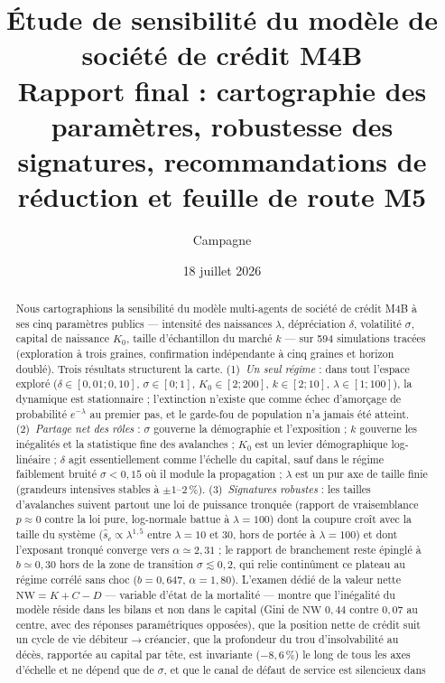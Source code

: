 \documentclass[11pt,a4paper]{article}
\title{Étude de sensibilité du modèle de société de crédit M4B\\
\large Rapport final : cartographie des paramètres, robustesse des
signatures, recommandations de réduction et feuille de route M5}
\author{Campagne \code{recherche/sensibilite\_m4b}}
\date{18 juillet 2026}
\newcommand{\NW}{\mathrm{NW}}
\begin{document}
\maketitle

\begin{abstract}
Nous cartographions la sensibilité du modèle multi-agents de société de
crédit M4B à ses cinq paramètres publics — intensité des naissances
$\lambda$, dépréciation $\delta$, volatilité $\sigma$, capital de
naissance $K_0$, taille d'échantillon du marché $k$ — sur 594
simulations tracées (exploration à trois graines, confirmation
indépendante à cinq graines et horizon doublé). Trois résultats
structurent la carte. (1)~\emph{Un seul régime} : dans tout l'espace
exploré ($\delta\in[0{,}01;0{,}10]$, $\sigma\in[0;1]$,
$K_0\in[2;200]$, $k\in[2;10]$, $\lambda\in[1;100]$), la dynamique est
stationnaire ; l'extinction n'existe que comme échec d'amorçage de
probabilité $e^{-\lambda}$ au premier pas, et le garde-fou de
population n'a jamais été atteint. (2)~\emph{Partage net des rôles} :
$\sigma$ gouverne la démographie et l'exposition ; $k$ gouverne les
inégalités et la statistique fine des avalanches ; $K_0$ est un levier
démographique log-linéaire ; $\delta$ agit essentiellement comme
l'échelle du capital, sauf dans le régime faiblement bruité
$\sigma<0{,}15$ où il module la propagation ; $\lambda$ est un pur axe
de taille finie (grandeurs intensives stables à $\pm1$--$2\,\%$).
(3)~\emph{Signatures robustes} : les tailles d'avalanches suivent
partout une loi de puissance tronquée (rapport de vraisemblance
$p\approx0$ contre la loi pure, log-normale battue à
$\lambda=100$) dont la coupure croît avec la taille du système
($\hat s_c\propto\lambda^{1{,}5}$ entre $\lambda=10$ et $30$, hors de
portée à $\lambda=100$) et dont l'exposant tronqué converge vers
$\alpha\simeq2{,}31$ ; le rapport de branchement reste épinglé à
$b\simeq0{,}30$ hors de la zone de transition $\sigma\lesssim0{,}2$,
qui relie continûment ce plateau au régime corrélé sans choc
($b=0{,}647$, $\alpha=1{,}80$). L'examen dédié de la valeur nette
$\NW=K+C-D$ — variable d'état de la mortalité — montre que
l'inégalité du modèle réside dans les bilans et non dans le capital
(Gini de $\NW$ $0{,}44$ contre $0{,}07$ au centre, avec des réponses
paramétriques opposées), que la position nette de crédit suit un cycle
de vie débiteur$\to$créancier, que la profondeur du trou
d'insolvabilité au décès, rapportée au capital par tête, est invariante
($-8{,}6\,\%$) le long de tous les axes d'échelle et ne dépend que de
$\sigma$, et que le canal de défaut de service est silencieux dans

\end{abstract}
\end{document}
